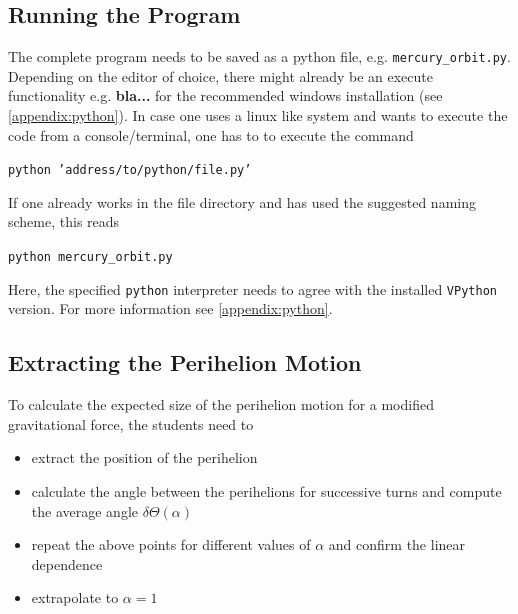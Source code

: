 \documentclass[12pt]{iopart}
\begin{document}
\subsection{Running the Program}
The complete program needs to be saved as a python file, e.g. \texttt{mercury\_orbit.py}.
Depending on the editor of choice, there might already be an execute functionality e.g. \textbf{bla...} for the recommended windows installation (see \ref{appendix:python}).
%
%
In case one uses a linux like system and wants to execute the code from a console/terminal, one has to to execute the command
\begin{center}
	\texttt{python 'address/to/python/file.py'}
\end{center}
If one already works in the file directory and has used the suggested naming scheme, this reads 
\begin{center}
	\texttt{python mercury\_orbit.py}
\end{center}
Here, the specified \texttt{python} interpreter needs to agree with the installed \texttt{VPython} version.
For more information see \ref{appendix:python}.

\subsection{Extracting the Perihelion Motion}


To calculate the expected size of the perihelion motion for a modified gravitational force, the students need to
\begin{itemize}
\item extract the position of the perihelion
\item calculate the angle between the perihelions for successive turns and compute the average angle $\delta \Theta (\alpha)$
\item repeat the above points for different values of $\alpha$ and confirm the linear dependence
\item extrapolate to $\alpha=1$
\end{itemize}
\\
\end{document}

